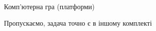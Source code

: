 ﻿\begin{problemAllDefault}{Комп'ютерна гра (платформи)}\label{problem:platforms-basic}

Пропускаємо, задача точно є в іншому комплекті

\end{problemAllDefault}